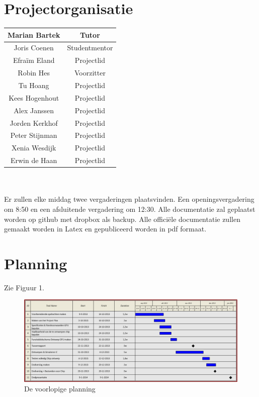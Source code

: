 \documentclass{scrartcl}
\begin{document}
\section{Projectorganisatie}
\begin {tabular}{|c|c|}
\hline
Marian Bartek & Tutor\\
\hline
Joris Coenen & Studentmentor\\
\hline
Efraïm Eland & Projectlid\\
\hline
Robin Hes & Voorzitter\\
\hline
Tu Hoang & Projectlid\\
\hline
Kees Hogenhout & Projectlid\\
\hline
Alex Janssen & Projectlid\\
\hline
Jorden Kerkhof & Projectlid\\
\hline
Peter Stijnman & Projectlid\\
\hline
Xenia Wesdijk & Projectlid\\
\hline
Erwin de Haan & Projectlid\\
\hline
\end {tabular}
\\
\\Er zullen elke middag twee vergaderingen plaatsvinden. Een openingsvergadering om 8:50 en een afsluitende vergadering om 12:30.
Alle documentatie zal geplaatst worden op github met dropbox als backup.
Alle officiële documentatie zullen gemaakt worden in Latex en gepubliceerd worden in pdf formaat.
\newpage
\section{Planning}
Zie Figuur 1.
 \begin{figure}[H]
\centering
	\includegraphics[width=18cm]{Planner}
	\caption{De voorlopige planning}
	\label{fig:planning}
\end{figure}
\end{document}
